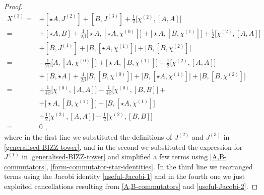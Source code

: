 \documentclass[10pt,a4paper]{amsart}
\begin{document}
\begin{proof}
\begin{equation}
\begin{aligned}
X^{(3)}=&+[\star A,J^{(2)}]+[B,J^{(3)}]+\tfrac{1}{2}\bigl[\chi^{(2)},[A,A]\bigr]
\\
=&+[\star A,B]+\tfrac{1}{2\beta}\bigl[\star A,[\star A,\chi^{(0)}]\bigr]+\bigl[\star A,[B,\chi^{(1)}]\bigr]+\tfrac{1}{2}\bigl[\chi^{(2)},[A,A]\bigr]
\\
&+[B,J^{(1)}]+\bigl[B,[\star A,\chi^{(1)}]\bigr]+\bigl[B,[B,\chi^{(2)}]\bigr]
\\
=&-\tfrac{1}{2\beta}\bigl[A,[A,\chi^{(0)}]\bigr]+\bigl[\star A,[B,\chi^{(1)}]\bigr]+\tfrac{1}{2}\bigl[\chi^{(2)},[A,A]\bigr]
\\
&+[B,\star A]+\tfrac{1}{2\beta}\bigl[B,[B,\chi^{(0)}]\bigr]+\bigl[B,[\star A,\chi^{(1)}]\bigr]+\bigl[B,[B,\chi^{(2)}]\bigr]
\\
=&+\tfrac{1}{4\beta}\bigl[\chi^{(0)},[A,A]\bigr]-\tfrac{1}{4\beta}\bigl[\chi^{(0)},[B,B]\bigr]+
\\
&+\bigl[\star A,[B,\chi^{(1)}]\bigr]+\bigl[B,[\star A,\chi^{(1)}]\bigr]
\\
&+\tfrac{1}{2}\bigl[\chi^{(2)},[A,A]\bigr]-\tfrac{1}{2}\bigl[\chi^{(2)},[B,B]\bigr]
\\
=&0 \,\, ,
\end{aligned}
\end{equation}
where in the first line we substituted the definitions of $J^{(2)}$ and $J^{(3)}$ in \eqref{generalised-BIZZ-tower}, and in the second we substituted the expression for $J^{(1)}$ in \eqref{generalised-BIZZ-tower} and simplified a few terms using \eqref{A,B-commutators}, \eqref{form-commutator-star-identities}. In the third line we rearranged terms using the Jacobi identity \eqref{useful-Jacobi-1} and in the fourth one we just exploited cancellations resulting from \eqref{A,B-commutators} and \eqref{useful-Jacobi-2}.
\end{proof}
\end{document}
